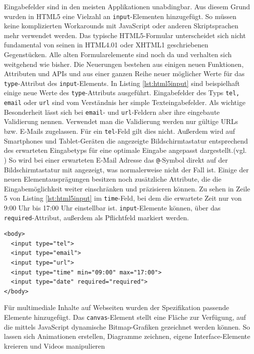 Eingabefelder sind in den meisten Applikationen unabdingbar. Aus diesem Grund wurden in HTML5 eine Vielzahl an \texttt{input}-Elementen hinzugefügt. So müssen keine komplizierten Workarounds mit JavaScript oder anderen Skriptsprachen mehr verwendet werden. \glqq Das typische HTML5-Formular unterscheidet sich nicht fundamental von seinen in HTML4.01 oder XHTML1 geschriebenen Gegenstücken. Alle alten Formularelemente sind noch da und verhalten sich weitgehend wie bisher. Die Neuerungen bestehen aus einigen neuen Funktionen, Attributen und APIs und aus einer ganzen Reihe neuer möglicher Werte für das \texttt{type}-Attribut des \texttt{input}-Elements.\grqq{}\cite[S.176]{KronHTML2011} In Listing \ref{lst:html5input} sind beispielhaft einige neue Werte des \texttt{type}-Attributs ausgeführt. Eingabefelder des Typs \texttt{tel, email} oder \texttt{url} sind vom Verständnis her simple Texteingabefelder. Als wichtige Besonderheit lässt sich bei \texttt{email}- und \texttt{url}-Feldern aber ihre eingebaute Validierung nennen. Verwendet man die Validierung werden nur gültige URLs bzw. E-Mails zugelassen. Für ein \texttt{tel}-Feld gilt dies nicht. Außerdem wird auf Smartphones und Tablet-Geräten die angezeigte Bildschirmtastatur entsprechend des erwarteten Eingabetyps für eine optimale Eingabe angepasst dargestellt.(vgl. \cite[S.178]{KronHTML2011}) So wird bei einer erwarteten E-Mail Adresse das \texttt{@}-Symbol direkt auf der Bildschirmtastatur mit angezeigt, was normalerweise nicht der Fall ist. Einige der neuen Elementausprägungen besitzen noch zusätzliche Attribute, die die Eingabemöglichkeit weiter einschränken und präzisieren können. Zu sehen in Zeile 5 von Listing \ref{lst:html5input} im \texttt{time}-Feld, bei dem die erwartete Zeit nur von 9:00 Uhr bis 17:00 Uhr einstellbar ist. \texttt{input}-Elemente können, über das \texttt{required}-Attribut, außerdem als Pflichtfeld markiert werden.

\vspace{1em}
\begin{lstlisting}[language=HTML5, caption=HTML5 \texttt{input}-Element, label=lst:html5input]
<body>
  <input type="tel">
  <input type="email">
  <input type="url">
  <input type="time" min="09:00" max="17:00">
  <input type="date" required="required">
</body>
\end{lstlisting}
	
Für multimediale Inhalte auf Webseiten wurden der Spezifikation passende Elemente hinzugefügt. Das \texttt{canvas}-Element \glqq [...] stellt eine Fläche zur Verfügung, auf die mittels JavaScript dynamische Bitmap-Grafiken gezeichnet werden können. So lassen sich Animationen erstellen, Diagramme zeichnen, eigene Interface-Elemente kreieren und Videos manipulieren\grqq{}\cite[S.353]{KronHTML2011}
	
